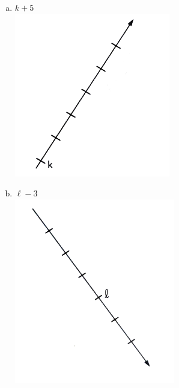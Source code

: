 \documentclass[a4paper,14pt]{article}
\begin{document}
\begin{multicols}{2}
\begin{enumerate}
\begin{enumerate}[a)]
    			\columnbreak
    			\item $k + 5$ \\
    			\noindent\includegraphics[width=1.1\linewidth]{imagens_6FMA39/imagem4}
    			\\
    			\item $\ell - 3$ \\
    			\noindent\includegraphics[width=1.1\linewidth]{imagens_6FMA39/imagem5}

\end{enumerate}
\end{enumerate}
\end{multicols}
\end{document}
